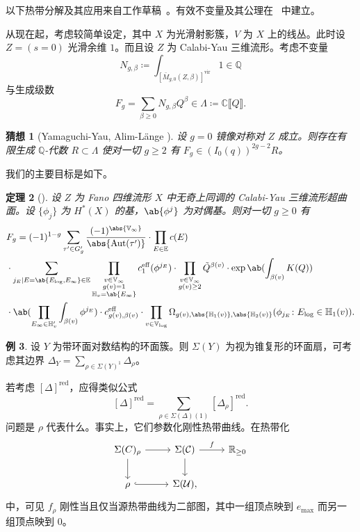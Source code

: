 \documentclass{amsart}
\newtheorem{thm}{定理}[section]
\newtheorem{conj}[thm]{猜想}
\theoremstyle{definition}
\newtheorem{exm}[thm]{例}
\theoremstyle{remark}
\theoremstyle{plain}
\theoremstyle{definition}
\theoremstyle{remark}
\newcommand{\R}{\mathbb{R}}
\newcommand{\C}{\mathbb{C}}
\newcommand{\Q}{\mathbb{Q}}
\newcommand{\E}{\mathbb{E}}
\newcommand{\V}{\mathbb{V}}
\renewcommand{\H}{\mathbb{H}}
\newcommand{\mc}[1]{\mathcal{#1}}
\newcommand{\mr}[1]{\mathrm{#1}}
\newcommand{\on}[1]{\operatorname{#1}}
\newcommand{\1}{\mathbf{1}}
\newcommand{\2}{\mathbf{2}}
\newcommand{\3}{\mathbf{3}}
\newcommand{\vir}{\mr{vir}}
\newcommand{\ps}[1]{\llbracket #1 \rrbracket}
\DeclareMathOperator{\Aut}{Aut}
\begin{document}
以下热带分解及其应用来自工作草稿~\cite{CJRtropical2025}。有效不变量及其公理在~\cite{CJRpunctured} 中建立。

从现在起，考虑较简单设定，其中 \(X\) 为光滑射影簇，\(V\) 为 \(X\) 上的线丛。此时设 \(Z = (s = 0)\) 光滑余维 \(1\)。而且设 \(Z\) 为 Calabi-Yau 三维流形。考虑不变量
\[ N_{g, \beta} \coloneqq \int_{[\bar{M}_{g,0}(Z, \beta)]^{\vir}} 1 \in \Q \]
与生成级数
\[ F_g = \sum_{\beta \geq 0} N_{g, \beta} Q^{\beta} \in \Lambda \coloneqq \C \ps{Q}. \]

\begin{conj}[Yamaguchi-Yau, Alim-L\"ange {\cite{YY2004,AlimLange2007}}]
    设 \(g=0\) 镜像对称对 \(Z\) 成立。则存在有限生成 \(\Q\)-代数 \(R \subset \Lambda\) 使对一切 \(g \geq 2\) 有 \(F_g \in (I_0(q))^{2g-2} R\)。
\end{conj}

我们的主要目标是如下。

\begin{thm}[{\cite{CJRtropical2025}}]
    设 \(Z\) 为 Fano 四维流形 \(X\) 中无奇上同调的 Calabi-Yau 三维流形超曲面。设 \(\{\phi_j\}\) 为 \(H^*(X)\) 的基，\(\ab\{\phi^j\}\) 为对偶基。则对一切 \(g \geq 0\) 有
    \begin{align*}
        &F_g = (-1)^{1-g} \sum_{\tau' \in G_g'} \frac{(-1)^{\abs{\V_{\infty}}}}{\abs{\Aut(\tau')}} \cdot \prod_{E \in \E} c(E) \\
        & \cdot \sum_{j_E \mid E = \ab\{E_{\log}, E_{\infty}\} \in \E} \prod_{\substack{v \in \V_{\infty} \\ g(v)=1 \\ \H_v = \ab\{E_{\infty}\}}} c_1^{\mr{eff}}(\phi^{j_E}) \cdot \prod_{\substack{v \in \V_{\infty} \\ g(v) \geq 2}} \tilde{Q}^{\beta(v)} \cdot \exp \ab(\int_{\beta(v)} K(Q) )  \\
        & \cdot \ab(\prod_{E_{\infty} \in \H_v'}\int_{\beta(v)} \phi^{j_E}) \cdot c_{g(v), \beta(v)}^{\on{eff}} 
         \cdot \prod_{v \in \V_{\log}} \Omega_{g(v), \abs{\H_1(v)}, \abs{\H_2(v)}} (\phi_{j_E} \colon E_{\log} \in \H_1(v)).
    \end{align*}
\end{thm}

\begin{exm}
    设 \(Y\) 为带环面对数结构的环面簇。则 \(\Sigma(Y)\) 为视为锥复形的环面扇，可考虑其边界 \(\Delta_Y = \sum_{\rho \in \Sigma(Y)^1} \Delta_{\rho}\)。
\end{exm}

若考虑 \([\Delta]^{\on{red}}\)，应得类似公式
\[ [\Delta]^{\on{red}} = \sum_{\rho \in \Sigma(\Delta)(1)} [\Delta_{\rho}]^{\on{red}}. \]
问题是 \(\rho\) 代表什么。事实上，它们参数化刚性热带曲线。在热带化
\begin{equation*}
\begin{tikzcd}
    \Sigma(C)_{\rho} \ar{d} \ar{r} & \Sigma(\mc{C}) \ar{r}{f} \ar{d} & \R_{\geq 0} \\
    \rho \ar[hookrightarrow]{r} & \Sigma(\mc{U}),
\end{tikzcd}
\end{equation*}
中，可见 \(f_{\rho}\) 刚性当且仅当源热带曲线为二部图，其中一组顶点映到 \(e_{\max}\) 而另一组顶点映到 \(0\)。
\end{document}
